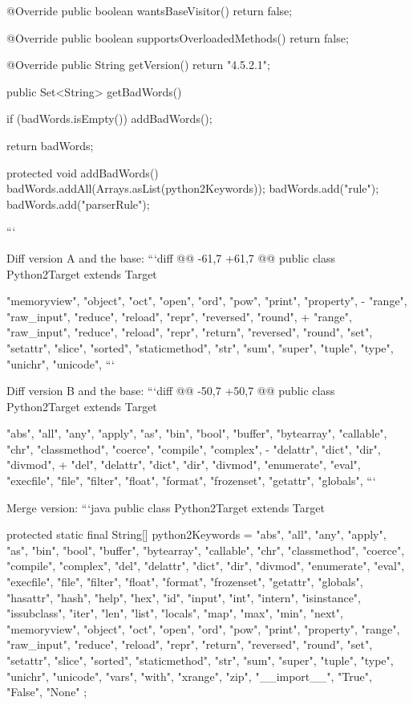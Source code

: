 \begin{prompt}
{    @Override
    public boolean wantsBaseVisitor() {
      return false;
    }
  
    @Override
    public boolean supportsOverloadedMethods() {
      return false;
    }
  
    @Override
    public String getVersion() {
      return "4.5.2.1";
    }
  
    public Set<String> getBadWords() {
      if (badWords.isEmpty()) {
        addBadWords();
      }
  
      return badWords;
    }
  
    protected void addBadWords() {
      badWords.addAll(Arrays.asList(python2Keywords));
      badWords.add("rule");
      badWords.add("parserRule");
    }
  }
  ```
  
  Diff version A and the base:
  ```diff
  @@ -61,7 +61,7 @@ public class Python2Target extends Target {
                  "memoryview",
                  "object", "oct", "open", "ord",
                  "pow", "print", "property",
  -               "range", "raw_input", "reduce", "reload", "repr", "reversed", "round",
  +               "range", "raw_input", "reduce", "reload", "repr", "return", "reversed", "round",
                  "set", "setattr", "slice", "sorted", "staticmethod", "str", "sum", "super",
                  "tuple", "type",
                  "unichr", "unicode",
  ```
  
  Diff version B and the base:
  ```diff
  @@ -50,7 +50,7 @@ public class Python2Target extends Target {
                  "abs", "all", "any", "apply", "as",
                  "bin", "bool", "buffer", "bytearray",
                  "callable", "chr", "classmethod", "coerce", "compile", "complex",
  -               "delattr", "dict", "dir", "divmod",
  +               "del", "delattr", "dict", "dir", "divmod",
                  "enumerate", "eval", "execfile",
                  "file", "filter", "float", "format", "frozenset",
                  "getattr", "globals",
  ```
  
  Merge version:
  ```java
  public class Python2Target extends Target {
    protected static final String[] python2Keywords = {
      "abs", "all", "any", "apply", "as",
      "bin", "bool", "buffer", "bytearray",
      "callable", "chr", "classmethod", "coerce", "compile", "complex",
      "del", "delattr", "dict", "dir", "divmod",
      "enumerate", "eval", "execfile",
      "file", "filter", "float", "format", "frozenset",
      "getattr", "globals",
      "hasattr", "hash", "help", "hex",
      "id", "input", "int", "intern", "isinstance", "issubclass", "iter",
      "len", "list", "locals",
      "map", "max", "min", "next",
      "memoryview",
      "object", "oct", "open", "ord",
      "pow", "print", "property",
      "range", "raw_input", "reduce", "reload", "repr", "return", "reversed", "round",
      "set", "setattr", "slice", "sorted", "staticmethod", "str", "sum", "super",
      "tuple", "type",
      "unichr", "unicode",
      "vars",
      "with",
      "xrange",
      "zip",
      "__import__",
      "True", "False", "None"
    };
  
}}}
\end{prompt}
